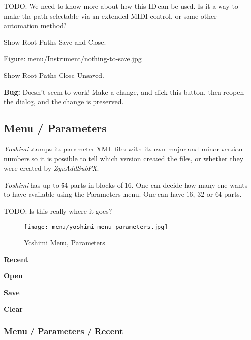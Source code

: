 TODO: We need to know more about how this ID can be used.
   Is it a way to make the path selectable via an extended MIDI control, or
   some other automation method?

   Show Root Paths Save and Close.

      Figure: menu/Instrument/nothing-to-save.jpg

   Show Root Paths Close Unsaved.

   \textbf{Bug:}
   Doesn't seem to work!
   Make a change, and click this button, then reopen the dialog, 
   and the change is preserved.

\subsection{Menu / Parameters}
\label{subsec:menu_parameters}

   \textsl{Yoshimi} stamps its parameter XML files with its own major and
   minor version numbers so it is possible to tell which version created the
   files, or whether they were created by \textsl{ZynAddSubFX}.

   \textsl{Yoshimi} has up to 64 parts in blocks of 16. One can
   decide how many one wants to have available using the Parameters menu.
   One can have 16, 32 or 64 parts.

   TODO:  Is this really where it goes?

\begin{figure}[H]
   \centering 
   \texttt{[image: menu/yoshimi-menu-parameters.jpg]}
   \caption{Yoshimi Menu, Parameters}
   \label{fig:yoshimi_menu_parameters}
\end{figure}

   \begin{enumber}
      \item \textbf{Recent}
      \item \textbf{Open}
      \item \textbf{Save}
      \item \textbf{Clear}
   \end{enumber}

\subsubsection{Menu / Parameters / Recent}
\label{subsubsec:menu_parameters_recent}

